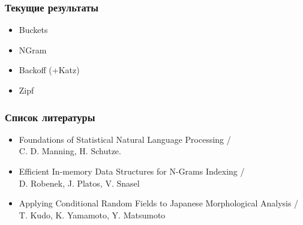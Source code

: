 \documentclass[14pt]{beamer}
\begin{document}
\begin{frame}
\frametitle{Текущие результаты}
\begin{itemize}
    \item Buckets
    \item NGram
    \item Backoff (+Katz)
    \item Zipf
\end{itemize}
\end{frame}

\begin{frame}
\frametitle{Список литературы}
\footnotesize{
\begin{itemize}
  \item Foundations of Statistical Natural Language Processing / \\C. D. Manning, H. Schutze.
  \item Efficient In-memory Data Structures for N-Grams Indexing / \\D. Robenek, J. Platos, V. Snasel
  \item Applying Conditional Random Fields to Japanese Morphological Analysis / T. Kudo, K. Yamamoto, Y. Matsumoto
\end{itemize}}
\end{frame}

\begin{frame}
\end{frame}
\end{document}
